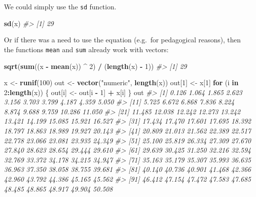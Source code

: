 \documentclass[]{book}
\newenvironment{Shaded}{\begin{snugshade}}{\end{snugshade}}
\newcommand{\CommentTok}[1]{\textcolor[rgb]{0.56,0.35,0.01}{\textit{#1}}}
\newcommand{\ControlFlowTok}[1]{\textcolor[rgb]{0.13,0.29,0.53}{\textbf{#1}}}
\newcommand{\DecValTok}[1]{\textcolor[rgb]{0.00,0.00,0.81}{#1}}
\newcommand{\KeywordTok}[1]{\textcolor[rgb]{0.13,0.29,0.53}{\textbf{#1}}}
\newcommand{\NormalTok}[1]{#1}
\newcommand{\OperatorTok}[1]{\textcolor[rgb]{0.81,0.36,0.00}{\textbf{#1}}}
\newcommand{\StringTok}[1]{\textcolor[rgb]{0.31,0.60,0.02}{#1}}
\theoremstyle{definition}
\theoremstyle{definition}
\theoremstyle{definition}
\theoremstyle{remark}
\begin{document}
We could simply use the \texttt{sd} function.

\begin{Shaded}
\begin{Highlighting}[]
\KeywordTok{sd}\NormalTok{(x)}
\CommentTok{#> [1] 29}
\end{Highlighting}
\end{Shaded}

Or if there was a need to use the equation (e.g.~for pedagogical
reasons), then the functions \texttt{mean} and \texttt{sum} already work
with vectors:

\begin{Shaded}
\begin{Highlighting}[]
\KeywordTok{sqrt}\NormalTok{(}\KeywordTok{sum}\NormalTok{((x }\OperatorTok{-}\StringTok{ }\KeywordTok{mean}\NormalTok{(x)) }\OperatorTok{^}\StringTok{ }\DecValTok{2}\NormalTok{) }\OperatorTok{/}\StringTok{ }\NormalTok{(}\KeywordTok{length}\NormalTok{(x) }\OperatorTok{-}\StringTok{ }\DecValTok{1}\NormalTok{))}
\CommentTok{#> [1] 29}
\end{Highlighting}
\end{Shaded}

\begin{Shaded}
\begin{Highlighting}[]
\NormalTok{x <-}\StringTok{ }\KeywordTok{runif}\NormalTok{(}\DecValTok{100}\NormalTok{)}
\NormalTok{out <-}\StringTok{ }\KeywordTok{vector}\NormalTok{(}\StringTok{"numeric"}\NormalTok{, }\KeywordTok{length}\NormalTok{(x))}
\NormalTok{out[}\DecValTok{1}\NormalTok{] <-}\StringTok{ }\NormalTok{x[}\DecValTok{1}\NormalTok{]}
\ControlFlowTok{for}\NormalTok{ (i }\ControlFlowTok{in} \DecValTok{2}\OperatorTok{:}\KeywordTok{length}\NormalTok{(x)) \{}
\NormalTok{  out[i] <-}\StringTok{ }\NormalTok{out[i }\OperatorTok{-}\StringTok{ }\DecValTok{1}\NormalTok{] }\OperatorTok{+}\StringTok{ }\NormalTok{x[i]}
\NormalTok{\}}
\NormalTok{out}
\CommentTok{#>   [1]  0.126  1.064  1.865  2.623  3.156  3.703  3.799  4.187  4.359  5.050}
\CommentTok{#>  [11]  5.725  6.672  6.868  7.836  8.224  8.874  9.688  9.759 10.286 11.050}
\CommentTok{#>  [21] 11.485 12.038 12.242 12.273 13.242 13.421 14.199 15.085 15.921 16.527}
\CommentTok{#>  [31] 17.434 17.470 17.601 17.695 18.392 18.797 18.863 18.989 19.927 20.143}
\CommentTok{#>  [41] 20.809 21.013 21.562 22.389 22.517 22.778 23.066 23.081 23.935 24.349}
\CommentTok{#>  [51] 25.100 25.819 26.334 27.309 27.670 27.840 28.623 28.654 29.444 29.610}
\CommentTok{#>  [61] 29.639 30.425 31.250 32.216 32.594 32.769 33.372 34.178 34.215 34.947}
\CommentTok{#>  [71] 35.163 35.179 35.307 35.993 36.635 36.963 37.350 38.058 38.755 39.681}
\CommentTok{#>  [81] 40.140 40.736 40.901 41.468 42.366 42.960 43.792 44.386 45.165 45.562}
\CommentTok{#>  [91] 46.412 47.154 47.472 47.583 47.685 48.485 48.865 48.917 49.904 50.508}
\end{Highlighting}
\end{Shaded}
\end{document}
